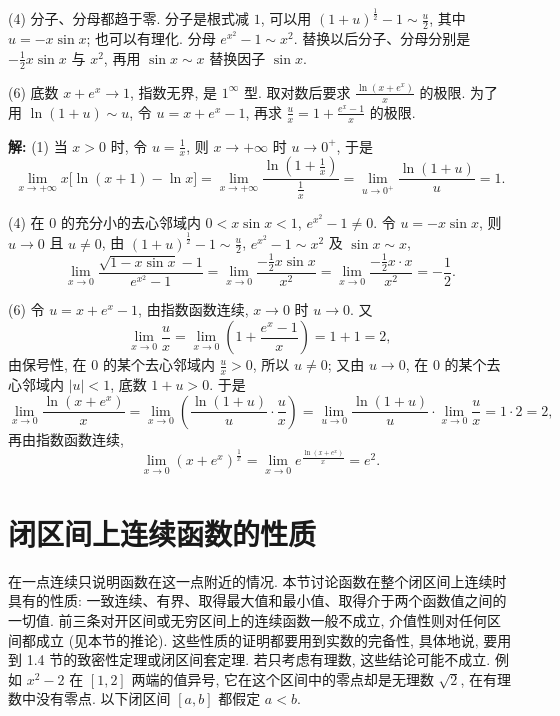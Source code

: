 \documentclass[UTF8,openany]{ctexbook}
\theoremstyle{chinesetextbook}
\newenvironment{cnsolution}{\par\indent\textbf{解:} \ignorespaces}{\par}
\begin{document}
(4) 分子、分母都趋于零. 分子是根式减 $1$, 可以用 $\displaystyle(1+u)^{\frac12}-1\sim\frac u2$, 其中 $u=-x\sin x$; 也可以有理化. 分母 $e^{x^2}-1\sim x^2$. 替换以后分子、分母分别是 $\displaystyle-\frac12x\sin x$ 与 $x^2$, 再用 $\sin x\sim x$ 替换因子 $\sin x$.

(6) 底数 $x+e^x\to1$, 指数无界, 是 $1^\infty$ 型. 取对数后要求 $\displaystyle\frac{\ln(x+e^x)}x$ 的极限. 为了用 $\ln(1+u)\sim u$, 令 $u=x+e^x-1$, 再求 $\displaystyle\frac ux=1+\frac{e^x-1}x$ 的极限.
\begin{cnsolution}
(1) 当 $x>0$ 时, 令 $\displaystyle u=\frac1x$, 则 $x\to+\infty$ 时 $u\to0^+$, 于是
\[
\lim_{x\to+\infty}x\bigl[\ln(x+1)-\ln x\bigr]=\lim_{x\to+\infty}\frac{\ln\left(1+\frac1x\right)}{\frac1x}=\lim_{u\to0^+}\frac{\ln(1+u)}u=1.
\]

(4) 在 $0$ 的充分小的去心邻域内 $0<x\sin x<1$, $e^{x^2}-1\ne0$. 令 $u=-x\sin x$, 则 $u\to0$ 且 $u\ne0$, 由 $\displaystyle(1+u)^{\frac12}-1\sim\frac u2$, $e^{x^2}-1\sim x^2$ 及 $\sin x\sim x$,
\[
\lim_{x\to0}\frac{\sqrt{1-x\sin x}-1}{e^{x^2}-1}=\lim_{x\to0}\frac{-\frac12x\sin x}{x^2}=\lim_{x\to0}\frac{-\frac12x\cdot x}{x^2}=-\frac12.
\]

(6) 令 $u=x+e^x-1$, 由指数函数连续, $x\to0$ 时 $u\to0$. 又
\[
\lim_{x\to0}\frac ux=\lim_{x\to0}\left(1+\frac{e^x-1}x\right)=1+1=2,
\]
由保号性, 在 $0$ 的某个去心邻域内 $\displaystyle\frac ux>0$, 所以 $u\ne0$; 又由 $u\to0$, 在 $0$ 的某个去心邻域内 $|u|<1$, 底数 $1+u>0$. 于是
\[
\lim_{x\to0}\frac{\ln(x+e^x)}x=\lim_{x\to0}\left(\frac{\ln(1+u)}u\cdot\frac ux\right)=\lim_{u\to0}\frac{\ln(1+u)}u\cdot\lim_{x\to0}\frac ux=1\cdot2=2,
\]
再由指数函数连续,
\[
\lim_{x\to0}\left(x+e^x\right)^{\frac1x}=\lim_{x\to0}e^{\frac{\ln(x+e^x)}x}=e^2.
\]
\end{cnsolution}
\section{闭区间上连续函数的性质}
在一点连续只说明函数在这一点附近的情况. 本节讨论函数在整个闭区间上连续时具有的性质: 一致连续、有界、取得最大值和最小值、取得介于两个函数值之间的一切值. 前三条对开区间或无穷区间上的连续函数一般不成立, 介值性则对任何区间都成立 (见本节的推论). 这些性质的证明都要用到实数的完备性, 具体地说, 要用到 1.4 节的致密性定理或闭区间套定理. 若只考虑有理数, 这些结论可能不成立. 例如 $x^2-2$ 在 $[1,2]$ 两端的值异号, 它在这个区间中的零点却是无理数 $\sqrt2$, 在有理数中没有零点. 以下闭区间 $[a,b]$ 都假定 $a<b$.
\end{document}
